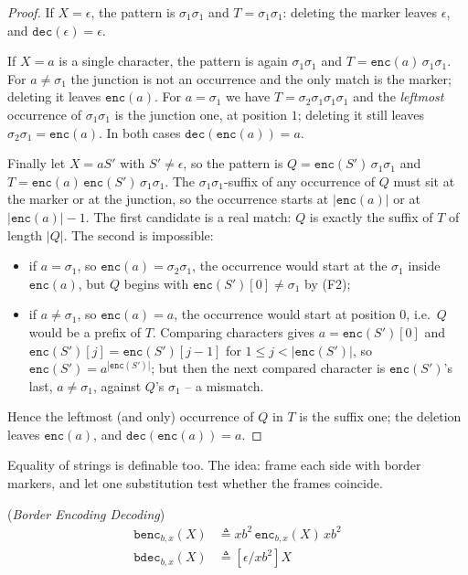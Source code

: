 \documentclass[runningheads,envcountsect]{llncs}
\begin{document}
\begin{proof}
    If $X = \epsilon$, the pattern is $\sigma_1\sigma_1$ and $T = \sigma_1\sigma_1$: deleting the marker leaves $\epsilon$, and $\mathtt{dec}(\epsilon) = \epsilon$.

    If $X = a$ is a single character, the pattern is again $\sigma_1\sigma_1$ and $T = \mathtt{enc}(a)\,\sigma_1\sigma_1$. For $a \neq \sigma_1$ the junction is not an occurrence and the only match is the marker; deleting it leaves $\mathtt{enc}(a)$. For $a = \sigma_1$ we have $T = \sigma_2\sigma_1\sigma_1\sigma_1$ and the \emph{leftmost} occurrence of $\sigma_1\sigma_1$ is the junction one, at position $1$; deleting it still leaves $\sigma_2\sigma_1 = \mathtt{enc}(a)$. In both cases $\mathtt{dec}(\mathtt{enc}(a)) = a$.

    Finally let $X = aS'$ with $S' \neq \epsilon$, so the pattern is $Q = \mathtt{enc}(S')\,\sigma_1\sigma_1$ and $T = \mathtt{enc}(a)\,\mathtt{enc}(S')\,\sigma_1\sigma_1$. The $\sigma_1\sigma_1$-suffix of any occurrence of $Q$ must sit at the marker or at the junction, so the occurrence starts at $|\mathtt{enc}(a)|$ or at $|\mathtt{enc}(a)|-1$. The first candidate is a real match: $Q$ is exactly the suffix of $T$ of length $|Q|$. The second is impossible:
    \begin{itemize}
        \item if $a = \sigma_1$, so $\mathtt{enc}(a) = \sigma_2\sigma_1$, the occurrence would start at the $\sigma_1$ inside $\mathtt{enc}(a)$, but $Q$ begins with $\mathtt{enc}(S')[0] \neq \sigma_1$ by (F2);
        \item if $a \neq \sigma_1$, so $\mathtt{enc}(a) = a$, the occurrence would start at position $0$, i.e.\ $Q$ would be a prefix of $T$. Comparing characters gives $a = \mathtt{enc}(S')[0]$ and $\mathtt{enc}(S')[j] = \mathtt{enc}(S')[j-1]$ for $1 \le j < |\mathtt{enc}(S')|$, so $\mathtt{enc}(S') = a^{|\mathtt{enc}(S')|}$; but then the next compared character is $\mathtt{enc}(S')$'s last, $a \neq \sigma_1$, against $Q$'s $\sigma_1$ -- a mismatch.
    \end{itemize}
    Hence the leftmost (and only) occurrence of $Q$ in $T$ is the suffix one; the deletion leaves $\mathtt{enc}(a)$, and $\mathtt{dec}(\mathtt{enc}(a)) = a$.
\end{proof}

Equality of strings is definable too. The idea: frame each side with border markers, and let one substitution test whether the frames coincide.

\begin{definition}
    (\emph{Border Encoding Decoding})
    \begin{align}
        \mathtt{benc}_{b, x}(X) & \triangleq xb^2\,\mathtt{enc}_{b, x}(X)\,xb^2 \\
        \mathtt{bdec}_{b, x}(X) & \triangleq [\epsilon/xb^2]X
    \end{align}
\end{definition}
\end{document}
